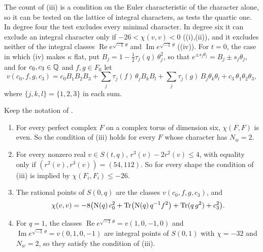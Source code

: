 The count of (iii) is a condition on the Euler
characteristic of the character alone, so it can be tested on the lattice of
integral characters, as  tests the quartic one. In
degree four the test excludes every minimal character. In degree six it can
exclude an integral character only if $-26<\chi(v,v)<0$
((i),(ii)), and it excludes neither of the integral
classes $\operatorname{Re}e^{\sqrt{-1}\,\theta}$ and
$\operatorname{Im}e^{\sqrt{-1}\,\theta}$ ((iv)). For
$t=0$, the case in which
(iv) makes $\kappa$ flat, put
$B_{j}=1-\tfrac12\tau_{j}(q)\,\theta_{j}^{2}$, so that
$e^{\pm s_{j}\theta_{j}}=B_{j}\pm s_{j}\theta_{j}$, and for
$c_{0},c_{3}\in\mathbb{Q}$ and $f,g\in F_{0}$ let
\[
  v(c_{0},f,g,c_{3})=c_{0}B_{1}B_{2}B_{3}
  +\sum_{j}\tau_{j}(f)\,\theta_{j}B_{k}B_{l}
  +\sum_{j}\tau_{j}(g)\,B_{j}\theta_{k}\theta_{l}
  +c_{3}\,\theta_{1}\theta_{2}\theta_{3},
\]
where $\{j,k,l\}=\{1,2,3\}$ in each sum.

\begin{proposition}
\label{prop:sexticintegral}
Keep the notation of .
\begin{enumerate}[label=\textup{(\roman*)},leftmargin=2.6em,itemsep=2pt]
\item For every perfect complex $F$ on a complex torus of dimension six,
  $\chi(F,F)$ is even. So the condition of (iii)
  holds for every $F$ whose character has $N_{w}=2$.
\item For every nonzero real $v\in S(t,q)$, $r^{3}(v)-2r^{2}(v)\le4$, with
  equality only if $(r^{2}(v),r^{3}(v))=(54,112)$. So for every shape the
  condition of (iii) is implied by
  $\chi(F_{i},F_{i})\le-26$.
\item The rational points of $S(0,q)$ are the classes $v(c_{0},f,g,c_{3})$,
  and
  \[
    \chi(v,v)=-8\bigl(\mathrm{N}(q)\,c_{0}^{2}+\operatorname{Tr}\bigl(\mathrm{N}(q)\,q^{-1}f^{2}\bigr)
    +\operatorname{Tr}(q\,g^{2})+c_{3}^{2}\bigr).
  \]
\item For $q=1$, the classes $\operatorname{Re}e^{\sqrt{-1}\,\theta}=v(1,0,-1,0)$
  and $\operatorname{Im}e^{\sqrt{-1}\,\theta}=v(0,1,0,-1)$ are integral
  points of $S(0,1)$ with $\chi=-32$ and $N_{w}=2$, so they satisfy the
  condition of (iii).
\end{enumerate}
\end{proposition}

